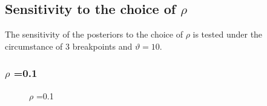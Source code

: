 \documentclass{article}
\begin{document}
\subsection{Sensitivity to the choice of $\rho$}

The sensitivity of the posteriors to the choice of $\rho$ is tested under the circumstance of 3 breakpoints and $\vartheta=10$.
\subsubsection{$\rho$ =0.1 }
\begin{figure}[H]
    \centering
    \caption{$\rho$ =0.1}
\end{figure}
\end{document}

